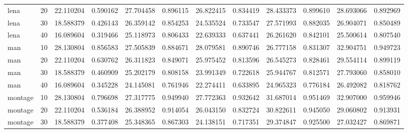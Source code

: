 \begin{tabular}{lrrrrrrrrrrr}
        lena &     20 &   22.110204 &    0.590162 &             27.704458 &              0.896115 &        26.822415 &         0.834419 &         28.433373 &          0.899610 &          28.693066 &           0.892969 \\
        lena &     30 &   18.588379 &    0.426143 &             26.359142 &              0.854253 &        24.535524 &         0.733547 &         27.571993 &          0.882035 &          26.904071 &           0.850489 \\
        lena &     40 &   16.089604 &    0.319466 &             25.118973 &              0.806433 &        22.639333 &         0.637441 &         26.261620 &          0.842101 &          25.500614 &           0.807540 \\
         man &     10 &   28.130804 &    0.856583 &             27.505839 &              0.884671 &        28.079581 &         0.890746 &         26.777158 &          0.831307 &          32.904751 &           0.949723 \\
         man &     20 &   22.110204 &    0.630762 &             26.311823 &              0.849071 &        25.975452 &         0.813596 &         26.545273 &          0.828461 &          29.554114 &           0.899119 \\
         man &     30 &   18.588379 &    0.460909 &             25.202179 &              0.808158 &        23.991349 &         0.722618 &         25.944767 &          0.812571 &          27.793060 &           0.858010 \\
         man &     40 &   16.089604 &    0.345228 &             24.145081 &              0.761946 &        22.274411 &         0.633895 &         24.965323 &          0.776184 &          26.492082 &           0.818762 \\
     montage &     10 &   28.130804 &    0.796698 &             27.317775 &              0.949940 &        27.772363 &         0.932642 &         31.687014 &          0.951469 &          32.907000 &           0.959946 \\
     montage &     20 &   22.110204 &    0.536184 &             26.388952 &              0.914054 &        26.043150 &         0.832724 &         30.822611 &          0.945050 &          29.060802 &           0.913931 \\
     montage &     30 &   18.588379 &    0.377408 &             25.348365 &              0.867303 &        24.138151 &         0.717351 &         29.374847 &          0.925500 &          27.032427 &           0.869871 \\

\end{tabular}
